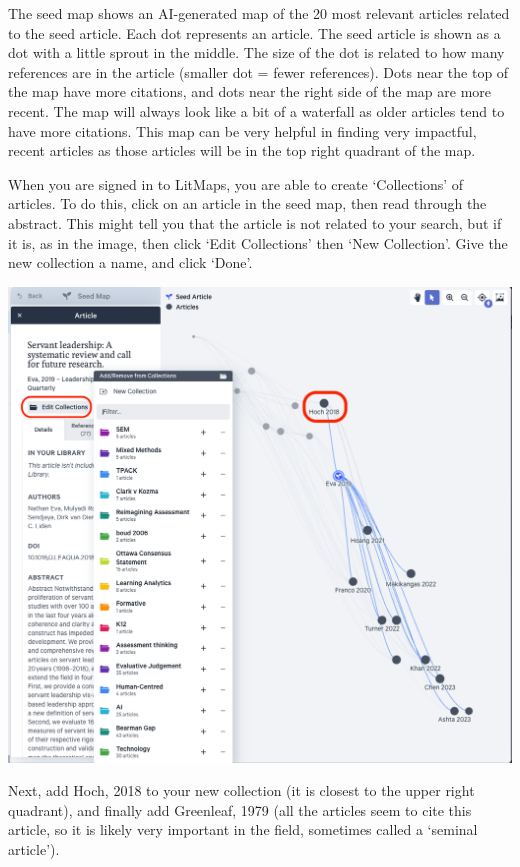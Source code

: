 \documentclass[
]{book}
\theoremstyle{definition}
\theoremstyle{definition}
\theoremstyle{definition}
\theoremstyle{definition}
\theoremstyle{remark}
\begin{document}
The seed map shows an AI-generated map of the 20 most relevant articles related to the seed article. Each dot represents an article. The seed article is shown as a dot with a little sprout in the middle. The size of the dot is related to how many references are in the article (smaller dot = fewer references). Dots near the top of the map have more citations, and dots near the right side of the map are more recent. The map will always look like a bit of a waterfall as older articles tend to have more citations. This map can be very helpful in finding very impactful, recent articles as those articles will be in the top right quadrant of the map.

When you are signed in to LitMaps, you are able to create `Collections' of articles. To do this, click on an article in the seed map, then read through the abstract. This might tell you that the article is not related to your search, but if it is, as in the image, then click `Edit Collections' then `New Collection'. Give the new collection a name, and click `Done'.

\includegraphics{assets/u2/litmaps3.png}

Next, add Hoch, 2018 to your new collection (it is closest to the upper right quadrant), and finally add Greenleaf, 1979 (all the articles seem to cite this article, so it is likely very important in the field, sometimes called a `seminal article').
\end{document}
